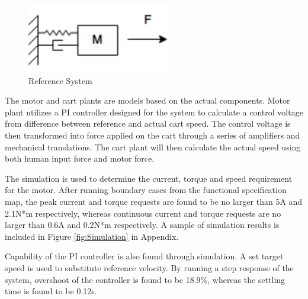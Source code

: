 \begin{figure}[h]
	\centering
	\includegraphics[width=0.5\linewidth]{Images/MSB}
	\caption{Reference System}
	\label{MSB}
\end{figure}

The motor and cart plants are models based on the actual components. Motor plant utilizes a PI controller designed for the system to calculate a control voltage from difference between reference and actual cart speed. The control voltage is then transformed into force applied on the cart through a series of amplifiers and mechanical translations. The cart plant will then calculate the actual speed using both human input force and motor force.

The simulation is used to determine the current, torque and speed requirement for the motor. After running boundary cases from the functional specification map, the peak current and torque requests are found to be no larger than 5A and 2.1N*m respectively, whereas continuous current and torque requests are no larger than 0.6A and 0.2N*m respectively. A sample of simulation results is included in Figure \ref{fig:Simulation} in Appendix.

Capability of the PI controller is also found through simulation. A set target speed is used to substitute reference velocity. By running a step response of the system, overshoot of the controller is found to be 18.9\%, whereas the settling time is found to be 0.12s.